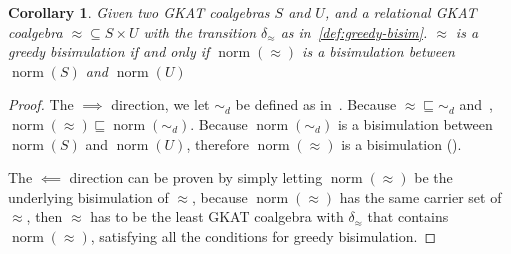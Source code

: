 \documentclass[conference]{IEEEtran}
\newtheorem{theorem}{Theorem}
\newtheorem{corollary}[theorem]{Corollary}
\DeclareMathOperator{\norm}{\mathrm{norm}}
\begin{document}
\begin{corollary}\label{thm:greedy-bisim-iff-norm-bisim}
    Given two GKAT coalgebras \(S\) and \(U\), and a relational GKAT coalgebra \({≈} ⊆ S × U\) with the transition \(δ_≈\) as in~\cref{def:greedy-bisim}.
    \(≈\) is a greedy bisimulation if and only if \(\norm(≈)\) is a bisimulation between \(\norm(S)\) and \(\norm(U)\)
\end{corollary}

\begin{proof}
    The \(⟹\) direction, we let \(∼_d\) be defined as in~.
    Because \({≈} ⊑ {∼_d}\) and~, \(\norm(≈) ⊑ \norm(∼_d)\). 
    Because \(\norm(∼_d)\) is a bisimulation between \(\norm(S)\) and \(\norm(U)\), therefore \(\norm(≈)\) is a bisimulation ().

    The \(⟸\) direction can be proven by simply letting \(\norm(≈)\) be the underlying bisimulation of \(≈\), because \(\norm(≈)\) has the same carrier set of \(≈\), then \(≈\) has to be the least GKAT coalgebra with \(δ_≈\) that contains \(\norm(≈)\), satisfying all the conditions for greedy bisimulation.
\end{proof}




\end{document}
